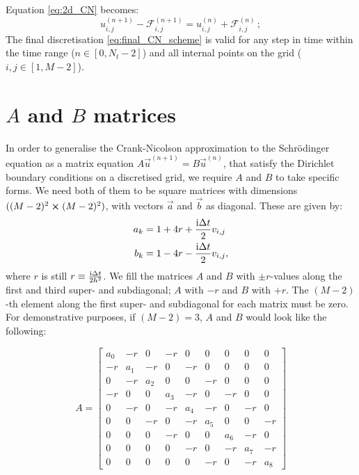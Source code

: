 Equation \eqref{eq:2d_CN} becomes:
\begin{equation}\label{eq:final_CN_scheme}
    u_{i,j}^{(n+1)} - \mathcal{F}_{i,j}^{(n+1)} = u_{i, j}^{(n)} + \mathcal{F}_{i,j}^{(n)} \, ;
\end{equation}
The final discretisation \eqref{eq:final_CN_scheme} is valid for any step in time within the time range ($n\in[0, N_t-2]$) and all internal points on the grid ($i,j \in [1, M-2]$).

\section{$A$ and $B$ matrices}\label{app:A_and_B}
    In order to generalise the Crank-Nicolson approximation to the Schrödinger equation as a matrix equation $A\vec{u}^{(n+1)} = B\vec{u}^{(n)}$, that satisfy the Dirichlet boundary conditions on a discretised grid, we require $A$ and $B$ to take specific forms. We need both of them to be square matrices with dimensions $((M-2)^2\cross(M-2)^2)$, with vectors $\vec{a}$ and $\vec{b}$ as diagonal. These are given by:
    \begin{equation}
        \begin{split}
            a_k &= 1+4r +\frac{\mathrm{i}\Delta t}{2}v_{i,j} \\
            b_k &= 1-4r -\frac{\mathrm{i}\Delta t}{2}v_{i,j},
        \end{split}
    \end{equation}
    where $r$ is still $r\equiv \frac{\mathrm{i}\Delta t}{2h^2}$. We fill the matrices $A$ and $B$ with $\pm r$-values along the first and third super- and subdiagonal; $A$ with $-r$ and $B$ with $+r$. The $(M-2)$-th element along the first super- and subdiagonal for each matrix must be zero. For demonstrative purposes, if $(M-2)=3$, $A$ and $B$ would look like the following:

    \begin{equation}
        A = 
        \begin{bmatrix} 
            a_0 & -r  & 0 & -r & 0 & 0 & 0 & 0 & 0 \\
            -r  & a_1 & -r & 0 & -r & 0 & 0 & 0 & 0 \\
             0  & -r  & a_2 & 0 & 0 & -r & 0 & 0 & 0 \\
            -r  & 0   & 0 & a_3 & -r & 0 & -r & 0 & 0 \\
             0  & -r  & 0 & -r & a_4 & -r & 0 & -r & 0 \\ 
             0  & 0   & -r & 0 & -r & a_5 & 0 & 0 & -r \\
             0  & 0   & 0 & -r & 0 & 0 & a_6 & -r & 0 \\
             0  & 0   & 0 & 0 & -r & 0 & -r & a_7 & -r \\
             0  & 0   & 0 & 0 & 0 & -r & 0 & -r & a_8  
        \end{bmatrix}
    \end{equation}

